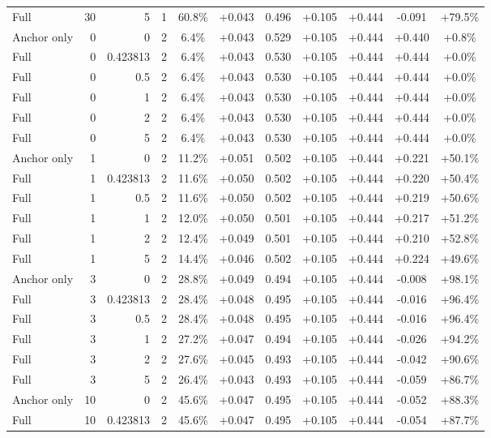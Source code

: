 \begin{table}[htbp]
\begin{tabular}{lrrrccccccc}
Full & 30 & 5 & 1 & 60.8\% & +0.043 & 0.496 & +0.105 & +0.444 & -0.091 & +79.5\% \\
Anchor only & 0 & 0 & 2 & 6.4\% & +0.043 & 0.529 & +0.105 & +0.444 & +0.440 & +0.8\% \\
Full & 0 & 0.423813 & 2 & 6.4\% & +0.043 & 0.530 & +0.105 & +0.444 & +0.444 & +0.0\% \\
Full & 0 & 0.5 & 2 & 6.4\% & +0.043 & 0.530 & +0.105 & +0.444 & +0.444 & +0.0\% \\
Full & 0 & 1 & 2 & 6.4\% & +0.043 & 0.530 & +0.105 & +0.444 & +0.444 & +0.0\% \\
Full & 0 & 2 & 2 & 6.4\% & +0.043 & 0.530 & +0.105 & +0.444 & +0.444 & +0.0\% \\
Full & 0 & 5 & 2 & 6.4\% & +0.043 & 0.530 & +0.105 & +0.444 & +0.444 & +0.0\% \\
Anchor only & 1 & 0 & 2 & 11.2\% & +0.051 & 0.502 & +0.105 & +0.444 & +0.221 & +50.1\% \\
Full & 1 & 0.423813 & 2 & 11.6\% & +0.050 & 0.502 & +0.105 & +0.444 & +0.220 & +50.4\% \\
Full & 1 & 0.5 & 2 & 11.6\% & +0.050 & 0.502 & +0.105 & +0.444 & +0.219 & +50.6\% \\
Full & 1 & 1 & 2 & 12.0\% & +0.050 & 0.501 & +0.105 & +0.444 & +0.217 & +51.2\% \\
Full & 1 & 2 & 2 & 12.4\% & +0.049 & 0.501 & +0.105 & +0.444 & +0.210 & +52.8\% \\
Full & 1 & 5 & 2 & 14.4\% & +0.046 & 0.502 & +0.105 & +0.444 & +0.224 & +49.6\% \\
Anchor only & 3 & 0 & 2 & 28.8\% & +0.049 & 0.494 & +0.105 & +0.444 & -0.008 & +98.1\% \\
Full & 3 & 0.423813 & 2 & 28.4\% & +0.048 & 0.495 & +0.105 & +0.444 & -0.016 & +96.4\% \\
Full & 3 & 0.5 & 2 & 28.4\% & +0.048 & 0.495 & +0.105 & +0.444 & -0.016 & +96.4\% \\
Full & 3 & 1 & 2 & 27.2\% & +0.047 & 0.494 & +0.105 & +0.444 & -0.026 & +94.2\% \\
Full & 3 & 2 & 2 & 27.6\% & +0.045 & 0.493 & +0.105 & +0.444 & -0.042 & +90.6\% \\
Full & 3 & 5 & 2 & 26.4\% & +0.043 & 0.493 & +0.105 & +0.444 & -0.059 & +86.7\% \\
Anchor only & 10 & 0 & 2 & 45.6\% & +0.047 & 0.495 & +0.105 & +0.444 & -0.052 & +88.3\% \\
Full & 10 & 0.423813 & 2 & 45.6\% & +0.047 & 0.495 & +0.105 & +0.444 & -0.054 & +87.7\% \\

\end{tabular}
\end{table}
